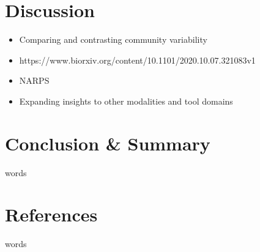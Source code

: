 \documentclass[fleqn,12pt]{SelfArx} %
\begin{document}

\section{Discussion}
\begin{itemize}
\item Comparing and contrasting community variability
\item https://www.biorxiv.org/content/10.1101/2020.10.07.321083v1
\item NARPS
\item Expanding insights to other modalities and tool domains
\end{itemize}

\section{Conclusion \& Summary}
words

\section{References}
words

% 
% 

\end{document}
